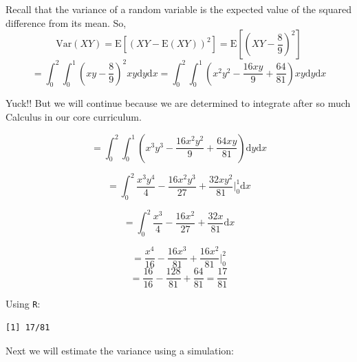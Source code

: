 \documentclass[
  letterpaper,
  DIV=11,
  numbers=noendperiod]{scrreprt}
\newenvironment{Shaded}{\begin{snugshade}}{\end{snugshade}}
\newcommand{\AttributeTok}[1]{\textcolor[rgb]{0.40,0.45,0.13}{#1}}
\newcommand{\ControlFlowTok}[1]{\textcolor[rgb]{0.00,0.23,0.31}{#1}}
\newcommand{\DecValTok}[1]{\textcolor[rgb]{0.68,0.00,0.00}{#1}}
\newcommand{\FunctionTok}[1]{\textcolor[rgb]{0.28,0.35,0.67}{#1}}
\newcommand{\NormalTok}[1]{\textcolor[rgb]{0.00,0.23,0.31}{#1}}
\newcommand{\SpecialCharTok}[1]{\textcolor[rgb]{0.37,0.37,0.37}{#1}}
\begin{document}
Recall that the variance of a random variable is the expected value of
the squared difference from its mean. So, \[
\mbox{Var}(XY)=\mbox{E}\left[\left(XY-\mbox{E}(XY)\right)^2\right]=\mbox{E}\left[\left(XY-\frac{8}{9}\right)^2\right]
\] \[
=\int_0^2\int_0^1 \left(xy-\frac{8}{9}\right)^2 xy\mbox{d} y \mbox{d} x =\int_0^2\int_0^1 \left(x^2y^2-\frac{16xy}{9}+\frac{64}{81}\right)xy\mbox{d} y \mbox{d} x 
\]

Yuck!! But we will continue because we are determined to integrate after
so much Calculus in our core curriculum.

\[
=\int_0^2\int_0^1 \left(x^3y^3-\frac{16x^2y^2}{9}+\frac{64xy}{81}\right)\mbox{d} y \mbox{d} x 
\]

\[
=\int_0^2 \frac{x^3y^4}{4}-\frac{16x^2y^3}{27}+\frac{32xy^2}{81}\bigg|_0^1 \mbox{d} x 
\]

\[
= \int_0^2 \frac{x^3}{4}-\frac{16x^2}{27}+\frac{32x}{81}\mbox{d} x 
\]

\[
= \frac{x^4}{16}-\frac{16x^3}{81}+\frac{16x^2}{81}\bigg|_0^2 
\] \[
=\frac{16}{16}-\frac{128}{81}+\frac{64}{81}=\frac{17}{81}
\]

Using \texttt{R}:

\begin{Shaded}
\end{Shaded}

\begin{verbatim}
[1] 17/81
\end{verbatim}

Next we will estimate the variance using a simulation:
\end{document}
